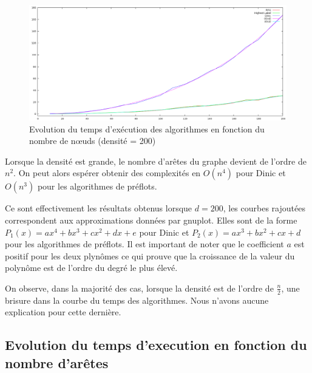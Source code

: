\begin{figure}
\begin{center}
\includegraphics[scale=1.2]{../data_struct/results/ratio200b.png}
\end{center}
\caption{Evolution du temps d'exécution des algorithmes en fonction du nombre de n\oe uds (densité =
200)}
\label{d200}
\end{figure}

Lorsque la densité est grande, le nombre d'arêtes du graphe devient de l'ordre de $n^2$. On peut
alors espérer obtenir des complexités en $O(n^4)$ pour Dinic et $O(n^3)$ pour les algorithmes de
préflots.

Ce sont effectivement les résultats obtenus lorsque $d=200$, les courbes rajoutées correspondent aux
approximations données par gnuplot. Elles sont de la forme $P_1(x) = ax^4 + bx^3 +cx^2 +dx +e$ pour
Dinic et $P_2(x) = ax^3 + bx^2 + cx +d$ pour les algorithmes de préflots. Il est important de noter
que le coefficient $a$ est positif pour les deux plynômes ce qui prouve que la croissance de la
valeur du polynôme est de l'ordre du degré le plus élevé.

On observe, dans la majorité des cas, lorsque la densité est de l'ordre de $\frac{n}{2}$, une
brisure dans la courbe du temps des algorithmes. Nous n'avons aucune explication pour cette
dernière.

\subsection{Evolution du temps d'execution en fonction du nombre d'arêtes}

